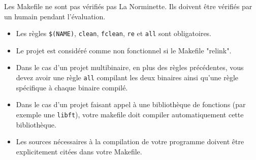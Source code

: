\documentclass{42-fr}
\begin{document}
            Les Makefile ne sont pas vérifiés pas La Norminette.
            Ils doivent être vérifiés par un humain pendant l'évaluation.
            \begin{itemize}

                \item Les règles \texttt{\$(NAME)}, \texttt{clean}, \texttt{fclean}, \texttt{re} et \texttt{all}
                    sont obligatoires.

                \item Le projet est considéré comme non fonctionnel si le Makefile "relink".

                  \item Dans le cas d’un projet multibinaire, en plus des règles précédentes,
                    vous devez avoir une règle \texttt{all} compilant les deux binaires ainsi qu’une règle
                    spécifique à chaque binaire compilé.
                
                  \item Dans le cas d’un projet faisant appel à une bibliothèque de fonctions
                    (par exemple une \texttt{libft}), votre makefile doit compiler
                    automatiquement cette bibliothèque.

                  \item Les sources nécessaires à la compilation de votre programme doivent être
                    explicitement citées dans votre Makefile.

            \end{itemize}
\end{document}
